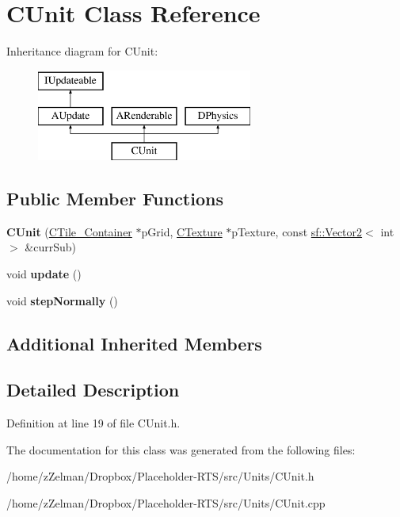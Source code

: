\hypertarget{classCUnit}{\section{C\-Unit Class Reference}
\label{classCUnit}
}
Inheritance diagram for C\-Unit\-:\begin{figure}[H]
\begin{center}
\leavevmode
\includegraphics[height=3.000000cm]{classCUnit}
\end{center}
\end{figure}
\subsection*{Public Member Functions}
\begin{DoxyCompactItemize}
\item 
\hypertarget{classCUnit_ad438542eeeb73f398b526002e400cfc4}{{\bfseries C\-Unit} (\hyperlink{classCTile__Container}{C\-Tile\-\_\-\-Container} $\ast$p\-Grid, \hyperlink{classCTexture}{C\-Texture} $\ast$p\-Texture, const \hyperlink{classsf_1_1Vector2}{sf\-::\-Vector2}$<$ int $>$ \&curr\-Sub)}\label{classCUnit_ad438542eeeb73f398b526002e400cfc4}

\item 
\hypertarget{classCUnit_a8669992f78b1955874c14e66963f9752}{void {\bfseries update} ()}\label{classCUnit_a8669992f78b1955874c14e66963f9752}

\item 
\hypertarget{classCUnit_a3de88566a8ecfac18309859cf7282da2}{void {\bfseries step\-Normally} ()}\label{classCUnit_a3de88566a8ecfac18309859cf7282da2}

\end{DoxyCompactItemize}
\subsection*{Additional Inherited Members}


\subsection{Detailed Description}


Definition at line 19 of file C\-Unit.\-h.



The documentation for this class was generated from the following files\-:\begin{DoxyCompactItemize}
\item 
/home/z\-Zelman/\-Dropbox/\-Placeholder-\/\-R\-T\-S/src/\-Units/C\-Unit.\-h\item 
/home/z\-Zelman/\-Dropbox/\-Placeholder-\/\-R\-T\-S/src/\-Units/C\-Unit.\-cpp\end{DoxyCompactItemize}
